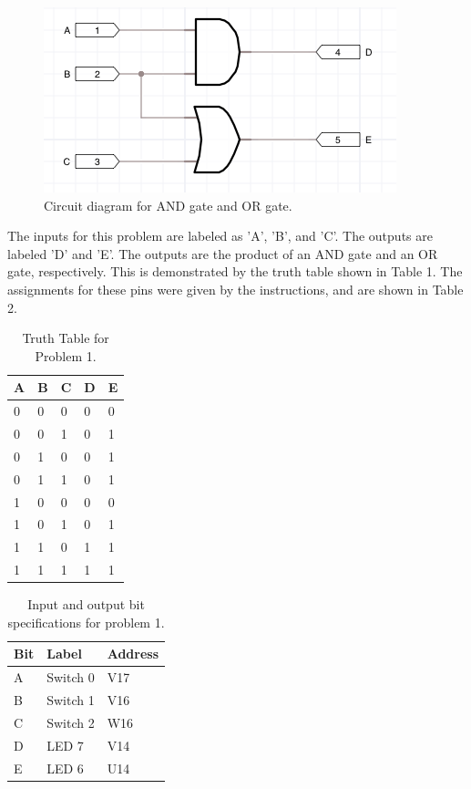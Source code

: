 \documentclass[11pt]{article}
\begin{document}
\begin{figure}[h]
	\includegraphics[width=\textwidth]{report_images/img1}
	\caption{\label{fig:figure-name}Circuit diagram for AND gate and OR gate.}
\end{figure}

The inputs for this problem are labeled as 'A', 'B', and 'C'. The outputs are labeled 'D' and 'E'. The outputs are the product of an AND gate and an OR gate, respectively. This is demonstrated by the truth table shown in Table 1. The assignments for these pins were given by the instructions, and are shown in Table 2.

\begin{table}[h]
\begin{center}
	\begin{tabular}{| l | l | l | l | l |}
		\hline
		A & B & C & D & E \\ \hline
		0 & 0 & 0 & 0 & 0 \\ \hline
		0 & 0 & 1 & 0 & 1 \\ \hline
		0 & 1 & 0 & 0 & 1 \\ \hline
		0 & 1 & 1 & 0 & 1 \\ \hline
		1 & 0 & 0 & 0 & 0 \\ \hline
		1 & 0 & 1 & 0 & 1 \\ \hline
		1 & 1 & 0 & 1 & 1 \\ \hline
		1 & 1 & 1 & 1 & 1 \\ \hline
	\end{tabular}
	\caption{\label{tab:table-name}Truth Table for Problem 1.}
\end{center}	
\end{table}

\begin{table}[h]
\begin{center}
	\begin{tabular}{| l | l | l |}
		\hline
		Bit & Label & Address\\ \hline
		A & Switch 0 & V17 \\ \hline
		B & Switch 1 & V16 \\ \hline
		C & Switch 2 & W16 \\ \hline
		D & LED 7 & V14 \\ \hline
		E & LED 6 & U14 \\ \hline
	\end{tabular}
	\caption{\label{tab:table-name}Input and output bit specifications for problem 1.}
\end{center}
\end{table}
\end{document}
